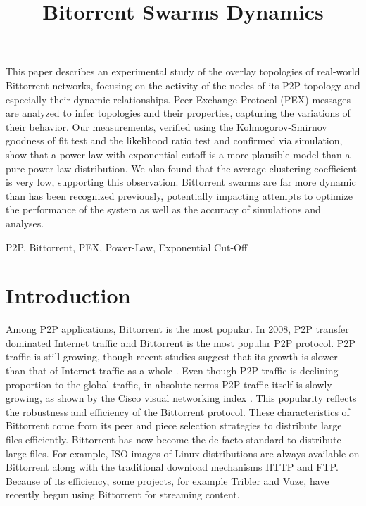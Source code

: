\documentclass[paper]{ieice}
\title{Bitorrent Swarms Dynamics}
\begin{document}
\maketitle

\begin{summary}
This paper describes an experimental study of the overlay topologies of real-world Bittorrent networks, focusing on the activity of the nodes of its P2P topology and especially their dynamic relationships. 
Peer Exchange Protocol (PEX) messages are analyzed to infer topologies and their properties, capturing the variations of their behavior.  
Our measurements, verified using the Kolmogorov-Smirnov goodness of fit test and the likelihood ratio test and confirmed via simulation, show that a power-law with exponential cutoff is a more plausible model than a pure power-law distribution.  
We also found that the average clustering coefficient is very low, supporting this observation.  
Bittorrent swarms are far more dynamic than has been recognized previously, potentially impacting attempts to optimize the performance of the system as well as the accuracy of simulations and analyses.
\end{summary}
\begin{keywords}
P2P, Bittorrent, PEX, Power-Law, Exponential Cut-Off
\end{keywords}


\section{Introduction}
Among P2P applications, Bittorrent is the most popular. 
In 2008, P2P transfer dominated Internet traffic and Bittorrent is the most popular P2P protocol.
P2P traffic is still growing, though recent studies suggest that its growth is slower than that of Internet traffic as a whole  \cite{labovitz2010internet} \cite{index2010forecast}. 
Even though P2P traffic is declining proportion to the global traffic, in absolute terms P2P traffic itself is slowly growing, as shown by the Cisco visual networking index \cite{index2010forecast}. 
This popularity reflects the robustness and efficiency of the Bittorrent protocol. 
These characteristics of Bittorrent come from its peer and piece selection strategies to distribute large files efficiently. 
Bittorrent has now become the de-facto standard to distribute large files. 
For example, ISO images of Linux distributions are always available on Bittorrent along with the traditional download mechanisms HTTP and FTP.  
Because of its efficiency, some projects, for example Tribler and Vuze, have recently begun using Bittorrent for streaming content.
\end{document}
